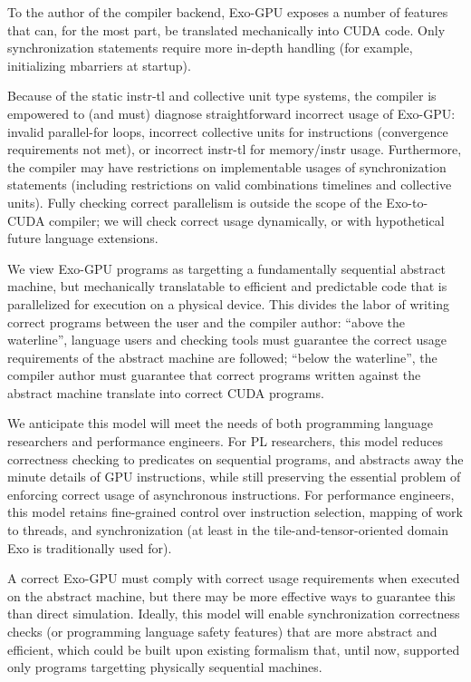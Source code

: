 \filbreak
{}

To the author of the compiler backend, Exo-GPU exposes a number of features that can, for the most part, be translated mechanically into CUDA code.
Only synchronization statements require more in-depth handling (for example, initializing mbarriers at startup).

\filbreak
Because of the static instr-tl and collective unit type systems, the compiler is empowered to (and must) diagnose straightforward incorrect usage of Exo-GPU: invalid parallel-for loops, incorrect collective units for instructions (convergence requirements not met), or incorrect instr-tl for memory/instr usage.
Furthermore, the compiler may have restrictions on implementable usages of synchronization statements (including restrictions on valid combinations timelines and collective units).
Fully checking correct parallelism is outside the scope of the Exo-to-CUDA compiler; we will check correct usage dynamically, or with hypothetical future language extensions.

\filbreak
{}

We view Exo-GPU programs as targetting a fundamentally sequential abstract machine, but mechanically translatable to efficient and predictable code that is parallelized for execution on a physical device.
This divides the labor of writing correct programs between the user and the compiler author: ``above the waterline'', language users and checking tools must guarantee the correct usage requirements of the abstract machine are followed; ``below the waterline'', the compiler author must guarantee that correct programs written against the abstract machine translate into correct CUDA programs.

\filbreak
We anticipate this model will meet the needs of both programming language researchers and performance engineers.
For PL researchers, this model reduces correctness checking to predicates on sequential programs, and abstracts away the minute details of GPU instructions, while still preserving the essential problem of enforcing correct usage of asynchronous instructions.
For performance engineers, this model retains fine-grained control over instruction selection, mapping of work to threads, and synchronization (at least in the tile-and-tensor-oriented domain Exo is traditionally used for).

\filbreak
A correct Exo-GPU must comply with correct usage requirements when executed on the abstract machine, but there may be more effective ways to guarantee this than direct simulation.
Ideally, this model will enable synchronization correctness checks (or programming language safety features) that are more abstract and efficient, which could be built upon existing formalism that, until now, supported only programs targetting physically sequential machines.

